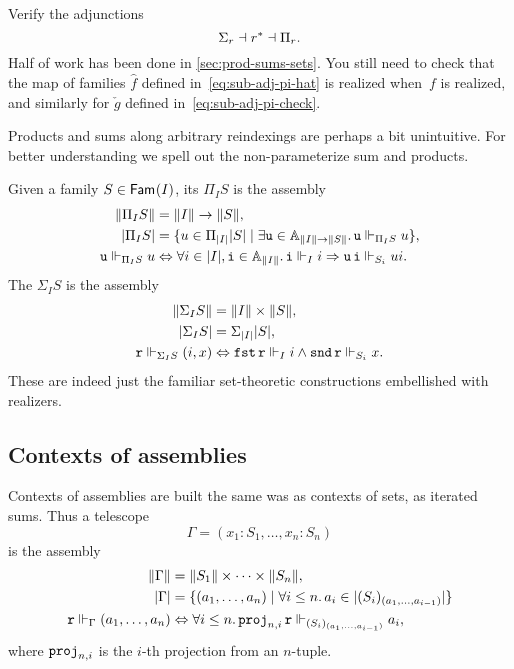 \begin{exercise}
  Verify the adjunctions
  \begin{equation*}
    \Sigma_r \dashv \invim{r} \dashv \Pi_r.
  \end{equation*}
  Half of work has been done in \cref{sec:prod-sums-sets}.
  You still need to check that the map of families $\hat{f}$ defined in~\eqref{eq:sub-adj-pi-hat} is realized when~$f$ is realized, and similarly for $\check{g}$ defined in~\eqref{eq:sub-adj-pi-check}.
\end{exercise}

Products and sums along arbitrary reindexings are perhaps a bit unintuitive. For better understanding we spell out the non-parameterize sum and products.

Given a family $S \in \Fam{I}$, its  $\Pi_I S$ is the assembly
%
\begin{align*}
  \T{\Pi_I S} &= \T{I} \to \T{S}, \\
  \S{\Pi_I S} &= \textstyle
     \set{u \in \Pi_{\S{I}} \S{S} \such
          \some{\R{u} \in \Atyp{\T{I} \to \T{S}}} \R{u} \rz[\Pi_I S] u
     },\\
  \R{u} \rz[\Pi_I S] u &\liff
  \all{i \in \S{I}, \R{i} \in \Atyp{\T{I}}}
    \R{i} \rz[I] i \lthen \R{u}\,\R{i} \rz[S_i] u i.
\end{align*}
%
The  $\Sigma_I S$ is the assembly
%
\begin{align*}
  \T{\Sigma_I S} &= \T{I} \times \T{S}, \\
  \S{\Sigma_I S} &= \Sigma_{\S{I}} \S{S}, \\
  \R{r} \rz[\Sigma_I S] (i, x) &\liff
    \combFst\,\R{r} \rz[I] i \land
    \combSnd\,\R{r} \rz[S_i] x.
\end{align*}
%
These are indeed just the familiar set-theoretic constructions embellished with realizers.

\subsection{Contexts of assemblies}
\label{sec:contexts-assemblies}

Contexts of assemblies are built the same was as contexts of sets, as iterated sums.
Thus a telescope
%
\begin{equation*}
  \Gamma = (x_1 : S_1, \ldots, x_n : S_n)
\end{equation*}
%
is the assembly
%
\begin{align*}
  \T{\Gamma} &= \T{S_1} \times \cdots \times \T{S_n}, \\
  \S{\Gamma} &= \set{(a_1, \ldots, a_n) \such \all{i \leq n} a_i \in \S{(S_i)_{(a_1, \ldots, a_{i-1})}}} \\
  \R{r} \rz[\Gamma] (a_1, \ldots, a_n)
  &\liff
  \all{i \leq n} \pcacomb{proj}_{n,i}\,\R{r} \rz[(S_i)_{(a_1, \ldots, a_{i-1})}] a_i,
\end{align*}
%
where $\pcacomb{proj}_{n,i}$ is the $i$-th projection from an $n$-tuple.

